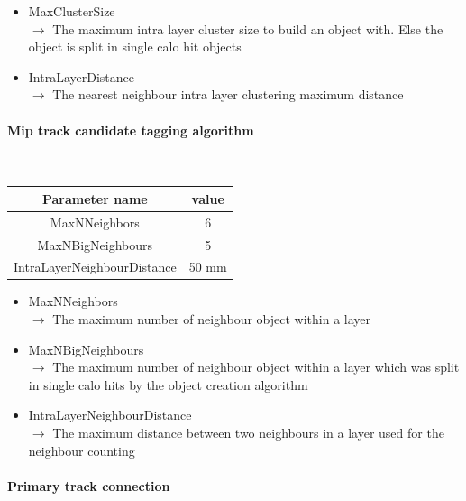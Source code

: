 \documentclass[cits]{JINST}
\begin{document}
\begin{itemize}
 \item MaxClusterSize \\
 $\rightarrow$ The maximum intra layer cluster size to build an object with. Else the object is split in single calo hit objects
 \item IntraLayerDistance \\
 $\rightarrow$ The nearest neighbour intra layer clustering maximum distance
\end{itemize}


\paragraph{Mip track candidate tagging algorithm} ~

\begin{table}[!h]
  \begin{center}
    \begin{tabu} to \linewidth { c | c } 
          Parameter name & value \\
          \hline
          MaxNNeighbors & 6 \\
          MaxNBigNeighbours & 5 \\
          IntraLayerNeighbourDistance & 50 mm
    \end{tabu} 
  \end{center}
\end{table}

\begin{itemize}
  \item MaxNNeighbors \\
  $\rightarrow$ The maximum number of neighbour object within a layer
  \item MaxNBigNeighbours \\
  $\rightarrow$ The maximum number of neighbour object within a layer which was split in single calo hits by the object creation algorithm
  \item IntraLayerNeighbourDistance \\
  $\rightarrow$ The maximum distance between two neighbours in a layer used for the neighbour counting
\end{itemize}

\newpage
\paragraph{Primary track connection} ~
\end{document}
